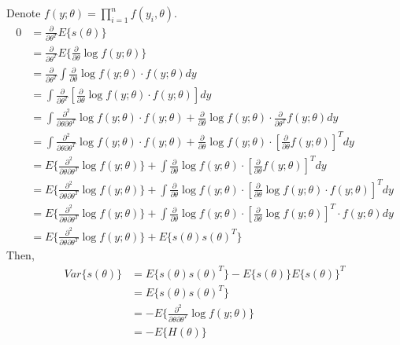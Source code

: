 \documentclass[11pt]{article}
\begin{document}
\begin{enumerate}[(A)]
Denote $f(y;\theta) = \prod_{i=1}^n f(y_i,\theta)$.
\begin{align*}
    0 &= \frac{\partial}{\partial \theta^T} E\{s(\theta)\} \\
    &= \frac{\partial}{\partial \theta^T} E\{\frac{\partial}{\partial \theta} \log f(y;\theta) \} \\
    &= \frac{\partial}{\partial \theta^T} \int \frac{\partial}{\partial \theta} \log f(y;\theta) \cdot f(y;\theta)dy \\
    &= \int \frac{\partial}{\partial \theta^T} \left[ \frac{\partial}{\partial \theta} \log f(y;\theta) \cdot f(y;\theta) \right]dy \\
    &= \int \frac{\partial^2}{\partial \theta \partial \theta^T} \log f(y;\theta) \cdot f(y;\theta) + \frac{\partial}{\partial \theta} \log f(y;\theta) \cdot \frac{\partial}{\partial \theta^T} f(y;\theta) dy \\
    &= \int \frac{\partial^2}{\partial \theta \partial \theta^T} \log f(y;\theta) \cdot f(y;\theta) + \frac{\partial}{\partial \theta} \log f(y;\theta) \cdot \left[\frac{\partial}{\partial \theta}  f(y;\theta) \right]^T dy \\
    &= E\{\frac{\partial^2}{\partial \theta \partial \theta^T} \log f(y;\theta)\} + \int \frac{\partial}{\partial \theta} \log f(y;\theta) \cdot \left[\frac{\partial}{\partial \theta}  f(y;\theta) \right]^T dy \\
    &= E\{\frac{\partial^2}{\partial \theta \partial \theta^T} \log f(y;\theta)\} + \int \frac{\partial}{\partial \theta} \log f(y;\theta) \cdot \left[\frac{\partial}{\partial \theta}  \log f(y;\theta) \cdot f(y;\theta) \right]^T dy \\
    &= E\{\frac{\partial^2}{\partial \theta \partial \theta^T} \log f(y;\theta)\} + \int \frac{\partial}{\partial \theta} \log f(y;\theta) \cdot \left[\frac{\partial}{\partial \theta}  \log f(y;\theta) \right]^T  \cdot f(y;\theta) dy \\
    &= E\{\frac{\partial^2}{\partial \theta \partial \theta^T} \log f(y;\theta)\} + E\{s(\theta)s(\theta)^T\}
\end{align*}
Then,
\begin{align*}
    Var\{s(\theta)\} &= E\{s(\theta)s(\theta)^T\} - E\{s(\theta)\}E\{s(\theta)\}^T \\
    &= E\{s(\theta)s(\theta)^T\} \\
    &= - E\{\frac{\partial^2}{\partial \theta \partial \theta^T} \log f(y;\theta)\} \\
    &= -E\{H(\theta)\}
\end{align*}
\bigskip


\end{enumerate}
\end{document}
